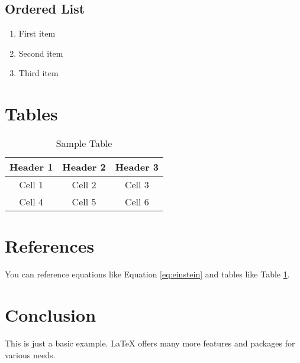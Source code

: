\documentclass{article}
\begin{document}
\subsection{Ordered List}
\begin{enumerate}
    \item First item
    \item Second item
    \item Third item
\end{enumerate}

\section{Tables}
\begin{table}[htbp]
    \centering
    \begin{tabular}{|c|c|c|}
        \hline
        Header 1 & Header 2 & Header 3 \\
        \hline
        Cell 1 & Cell 2 & Cell 3 \\
        Cell 4 & Cell 5 & Cell 6 \\
        \hline
    \end{tabular}
    \caption{Sample Table}
    \label{tab:sample}
\end{table}

\section{References}
You can reference equations like Equation \ref{eq:einstein} and tables like Table \ref{tab:sample}.

\section{Conclusion}
This is just a basic example. \LaTeX{} offers many more features and packages for various needs.
\end{document}
